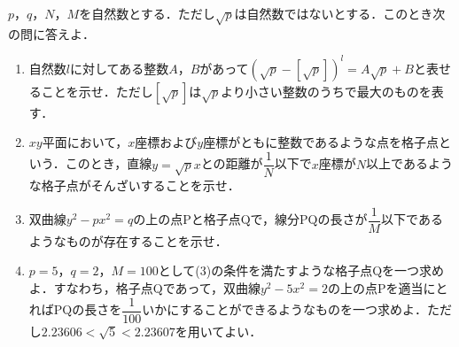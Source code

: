 \documentclass[../../main.tex]{subfiles}
\begin{document}
$p$，$q$，$N$，$M$を自然数とする．ただし$\sqrt{p}$は自然数ではないとする．このとき次の問に答えよ．
\begin{enumerate}
  \item 自然数$l$に対してある整数$A$，$B$があって$(\sqrt{p}-[\sqrt{p}])^l=A\sqrt{p}+B$と表せることを示せ．ただし$[\sqrt{p}] $は$\sqrt{p}$より小さい整数のうちで最大のものを表す．
  \item $xy$平面において，$x$座標および$y$座標がともに整数であるような点を格子点という．このとき，直線$y=\sqrt{p}x$との距離が$\dfrac{1}{N}$以下で$x$座標が$N$以上であるような格子点がそんざいすることを示せ．
  \item 双曲線$y^2-px^2=q$の上の点$\mathrm{P}$と格子点$\mathrm{Q}$で，線分$\mathrm{PQ}$の長さが$\dfrac{1}{M}$以下であるようなものが存在することを示せ．
  \item $p=5$，$q=2$，$M=100$として(3)の条件を満たすような格子点$\mathrm{Q}$を一つ求めよ．すなわち，格子点$\mathrm{Q}$であって，双曲線$y^2-5x^2=2$の上の点$\mathrm{P}$を適当にとれば$\mathrm{PQ}$の長さを$\dfrac{1}{100}$いかにすることができるようなものを一つ求めよ．ただし$2.23606<\sqrt{5}<2.23607$を用いてよい．
\end{enumerate}
\end{document}
